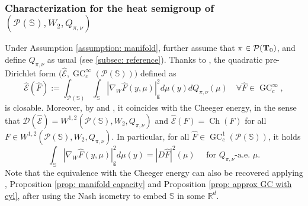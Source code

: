 \documentclass[10pt,leqno]{amsart}
\numberwithin{equation}{section}
\newcommand{\R}{\mathbb{R}}
\newcommand{\PP}{\mathcal{P}}
\newcommand{\ttg}{\mathtt{g}}
\newcommand{\Ss}{\mathbb{S}}
\begin{document}
\subsubsection{Characterization for the heat semigroup of $(\PP(\Ss),W_2, Q_{\pi,\nu})$}
    Under Assumption \ref{assumption: manifold}, further assume that $\pi \in \PP(\bold{T}_0)$, and define $Q_{\pi,\nu}$ as usual (see \eqref{subsec: reference}). Thanks to \cite[Theorem 3.39]{delloschiavo2024massive}, the quadratic pre-Dirichlet form $\big( \widehat{\mathcal{E}}, \operatorname{GC}_c^\infty(\PP(\Ss)) \big)$ defined as 
    \begin{equation}
        \widehat{\mathcal{E}}(\hat{F}) := \int_{\PP(\Ss)} \int_{\Ss} |\nabla_W\hat{F}(y,\mu)|^2
        _\ttg d\mu(y) dQ_{\pi,\nu}(\mu) \quad \forall \hat{F} \in \operatorname{GC}_c^{\infty},
    \end{equation}
    is closable. Moreover, by \cite[Proposition 3.31]{delloschiavo2024massive} and \cite[Theorem 6.2]{fornasier2023density}, it coincides with the Cheeger energy, in the sense that $\mathcal{D}(\widehat{\mathcal{E}}) = W^{1,2}(\PP(\Ss),W_2,Q_{\pi,\nu})$ and $\widehat{\mathcal{E}}(F) = \operatorname{Ch}(F)$ for all $F\in W^{1,2}(\PP(\Ss),W_2,Q_{\pi,\nu})$. In particular, for all $\widehat{F}\in \operatorname{GC}_c^1(\PP(\Ss))$, it holds
    \begin{equation}\label{eq: sob = dir form}
        \int_{\Ss} |\nabla_W\hat{F}(y,\mu)|^2
        _\ttg d\mu(y) = |D\widehat{F}|^2(\mu) \quad \text{ for }Q_{\pi,\nu}\text{-a.e. }\mu.
    \end{equation}
    Note that the equivalence with the Cheeger energy can also be recovered applying \cite[Theorem 6.2]{fornasier2023density}, Proposition \ref{prop: manifold capacity} and Proposition \ref{prop: approx GC with cyl}, after using the Nash isometry to embed $\Ss$ in some $\R^d$.
\end{document}
